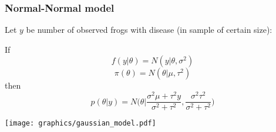 \documentclass{beamer}
\newcommand{\1}{\ensuremath{\mathbf{1}}}
\begin{document}
%
%
%
%
%
%
\begin{frame}\frametitle{Normal-Normal model}
	Let $y$ be number of observed frogs with disease (in sample of certain size):
	\begin{block}{}
		If
		\begin{equation}
			f(y|\theta) = N(y|\theta,\sigma^2)
		\end{equation}
		\begin{equation}
			\pi(\theta) = N(\theta|\mu,\tau^2)
		\end{equation}
		then
		\begin{equation}
			p(\theta|y) = N\Big( \theta \Big| \frac{\sigma^2\mu + \tau^2 y}{\sigma^2 + \tau^2}, \frac{\sigma^2\tau^2}{\sigma^2 + \tau^2} \Big)
		\end{equation}
	\end{block}
	\begin{center}
		\texttt{[image: graphics/gaussian\_model.pdf]}
	\end{center}
\end{frame}
%
%
%
\end{document}
